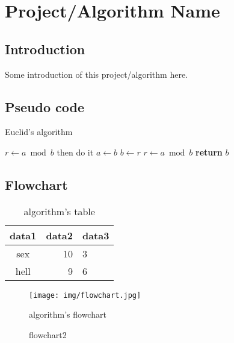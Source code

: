 \documentclass[cs4size, punct, nospace, fancyhdr, fntef]{ctexart}
\begin{document}
  \section{Project/Algorithm Name}
  
  \subsection{Introduction}
    Some introduction of this project/algorithm here.
  \subsection{Pseudo code}
    \begin{algorithm}
    \caption{Euclid's algorithm}\label{euclid}
    \begin{algorithmic}[1]
      \State $r\gets a\bmod b$
        \State then do it
      \EndIf
        \State $a\gets b$
        \State $b\gets r$
        \State $r\gets a\bmod b$
      \EndWhile\label{euclidendwhile}
      \State \textbf{return} $b$
    \EndProcedure
    \end{algorithmic}
    \end{algorithm}
    
  \subsection{Flowchart}
    \begin{table}[htb]
      \centering
      \begin{tabular}{c|r|l}
        \hline
        data1 & data2 & data3 \\
        \hline
        sex & 10 & 3 \\
        hell & 9 & 6 \\
        \hline
      \end{tabular}
      \caption{algorithm's table}\label{tabledemo1}
    \end{table}
    \begin{figure}[H]
      \centering
      \texttt{[image: img/flowchart.jpg]}
      \caption[flowchart]{algorithm's flowchart}\label{fig:flowchart}
    \end{figure}
    \begin{figure}[H]
      \centering
      \caption{flowchart2}\label{flowchart1}
    \end{figure}
    
\end{document}
